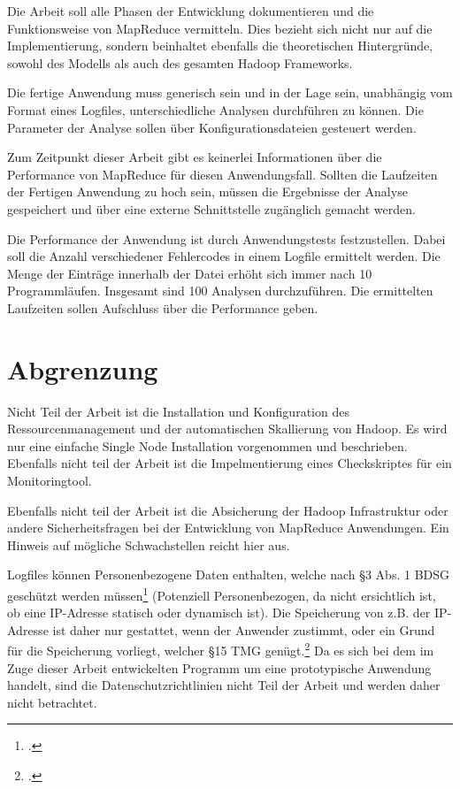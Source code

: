 Die Arbeit soll alle Phasen der Entwicklung dokumentieren und die Funktionsweise von MapReduce vermitteln. Dies bezieht sich nicht nur auf die Implementierung, sondern beinhaltet ebenfalls die theoretischen Hintergründe, sowohl des Modells als auch des gesamten Hadoop Frameworks.

Die fertige Anwendung muss generisch sein und in der Lage sein, unabhängig vom Format eines Logfiles, unterschiedliche Analysen durchführen zu können. Die Parameter der Analyse sollen über Konfigurationsdateien gesteuert werden.

\newpage
Zum Zeitpunkt dieser Arbeit gibt es keinerlei Informationen über die Performance von MapReduce für diesen Anwendungsfall. Sollten die Laufzeiten der Fertigen Anwendung zu hoch sein, müssen die Ergebnisse der Analyse gespeichert und über eine externe Schnittstelle zugänglich gemacht werden.

Die Performance der Anwendung ist durch Anwendungstests festzustellen. Dabei soll die Anzahl verschiedener Fehlercodes in einem Logfile ermittelt werden. Die Menge der Einträge innerhalb der Datei erhöht sich immer nach 10 Programmläufen. Insgesamt sind 100 Analysen durchzuführen. Die ermittelten Laufzeiten sollen Aufschluss über die Performance geben.

\section{Abgrenzung}\label{sec:Abgrenzung}
Nicht Teil der Arbeit ist die Installation und Konfiguration des Ressourcenmanagement und der automatischen Skallierung von Hadoop. Es wird nur eine einfache Single Node Installation vorgenommen und beschrieben. Ebenfalls nicht teil der Arbeit ist die Impelmentierung eines Checkskriptes für ein Monitoringtool.

Ebenfalls nicht teil der Arbeit ist die Absicherung der Hadoop Infrastruktur oder andere Sicherheitsfragen bei der Entwicklung von MapReduce Anwendungen. Ein Hinweis auf mögliche Schwachstellen reicht hier aus.

Logfiles können Personenbezogene Daten enthalten, welche nach §3 Abs. 1 \ac{BDSG} geschützt werden müssen\footcite[§3 Abs. 1 BDSG,][]{BDSG3.1990} (Potenziell Personenbezogen, da nicht ersichtlich ist, ob eine \ac{IP}-Adresse statisch oder dynamisch ist). Die Speicherung von z.B. der \ac{IP}-Adresse ist daher nur gestattet, wenn der Anwender zustimmt, oder ein Grund für die Speicherung vorliegt, welcher §15 \ac{TMG} genügt.\footcite[§15 TMG,][]{TMG15.2007}  Da es sich bei dem im Zuge dieser Arbeit entwickelten Programm um eine prototypische Anwendung handelt, sind die Datenschutzrichtlinien nicht Teil der Arbeit und werden daher nicht betrachtet.

